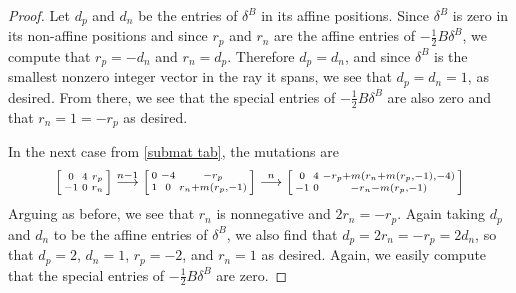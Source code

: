 \documentclass{amsart}
\theoremstyle{definition}
\theoremstyle{remark}
\numberwithin{equation}{section}
\newcommand{\0}{{\mathbf{0}}}
\begin{document}
\begin{proof}
Let $d_p$ and $d_n$ be the entries of $\delta^B$ in its affine positions.
Since $\delta^B$ is zero in its non-affine positions and since $r_p$ and $r_n$ are the affine entries of $-\frac12B\delta^B$, we compute that $r_p=-d_n$ and $r_n=d_p$.
Therefore $d_p=d_n$, and since $\delta^B$ is the smallest nonzero integer vector in the ray it spans, we see that $d_p=d_n=1$, as desired.
From there, we see that the special entries of $-\frac12B\delta^B$ are also zero and that $r_n=1=-r_p$ as desired.

In the next case from \cref{submat tab}, the mutations are
\[\begin{bsmallmatrix*}
0 & 4 & r_p\\
-1 & 0 &r_n
\end{bsmallmatrix*}\overset{n-1}{\longrightarrow}
\begin{bsmallmatrix*}
0 & -4 & -r_p\\
1 & 0 &r_n+m(r_p,-1)
\end{bsmallmatrix*}\overset{n}{\longrightarrow}
\begin{bsmallmatrix*}
0 & 4 &-r_p+m(r_n+m(r_p,-1),-4)\\
-1 & 0 &-r_n-m(r_p,-1)
\end{bsmallmatrix*}
\]
Arguing as before, we see that $r_n$ is nonnegative and $2r_n=-r_p$.
Again taking $d_p$ and $d_n$ to be the affine entries of $\delta^B$, we also find that $d_p=2r_n=-r_p=2d_n$, so that $d_p=2$, $d_n=1$, $r_p=-2$, and $r_n=1$ as desired.
Again, we easily compute that the special entries of $-\frac12B\delta^B$ are zero.


\end{proof}
\end{document}
